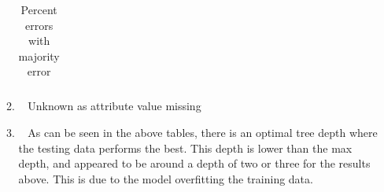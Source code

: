 \documentclass[12pt, fullpage,letterpaper]{article}
\begin{document}
\begin{enumerate}
\begin{enumerate}
\begin{table}[h]
\begin{tabular}{c|cc}
		\end{tabular}
		\caption{Percent errors with majority error}
		
		\end{table}
	
	\item~ Unknown as attribute value missing
	
	
	\item~ As can be seen in the above tables, there is an optimal tree depth where the testing data performs the best. This depth is lower than the max depth, and appeared to be around a depth of two or three for the results above. This is due to the model overfitting the training data. 
\end{enumerate}
\end{enumerate}
\end{document}
